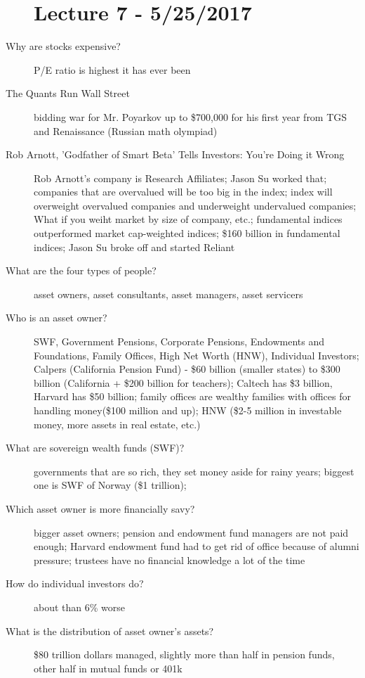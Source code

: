 \documentclass[11pt]{article}
\begin{document}
\begin{description}
\section{Lecture 7 - 5/25/2017}
\item[Why are stocks expensive?]
  P/E ratio is highest it has ever been
\item[The Quants Run Wall Street]
  bidding war for Mr. Poyarkov up to \$700,000 for his first year from TGS and Renaissance (Russian math olympiad)
\item[Rob Arnott, 'Godfather of Smart Beta' Tells Investors: You're Doing it Wrong]
  Rob Arnott's company is Research Affiliates;
  Jason Su worked that;
  companies that are overvalued will be too big in the index;
  index will overweight overvalued companies and underweight undervalued companies;
  What if you weiht market by size of company, etc.;
  fundamental indices outperformed market cap-weighted indices;
  \$160 billion in fundamental indices;
  Jason Su broke off and started Reliant
\item[What are the four types of people?]
  asset owners, asset consultants, asset managers, asset servicers
\item[Who is an asset owner?]
  SWF, Government Pensions, Corporate Pensions, Endowments and Foundations, Family Offices, High Net Worth (HNW), Individual Investors;
  Calpers (California Pension Fund) - \$60 billion (smaller states) to \$300 billion (California + \$200 billion for teachers);
  Caltech has \$3 billion, Harvard has \$50 billion;
  family offices are wealthy families with offices for handling money(\$100 million and up);
  HNW (\$2-5 million in investable money, more assets in real estate, etc.)
\item[What are sovereign wealth funds (SWF)?]
  governments that are so rich, they set money aside for rainy years;
  biggest one is SWF of Norway (\$1 trillion);
\item[Which asset owner is more financially savy?]
  bigger asset owners;
  pension and endowment fund managers are not paid enough;
  Harvard endowment fund had to get rid of office because of alumni pressure;
  trustees have no financial knowledge a lot of the time
\item[How do individual investors do?]
  about than 6\% worse
\item[What is the distribution of asset owner's assets?]
  \$80 trillion dollars managed, slightly more than half in pension funds, other half in mutual funds or 401k

\end{description}
\end{document}
